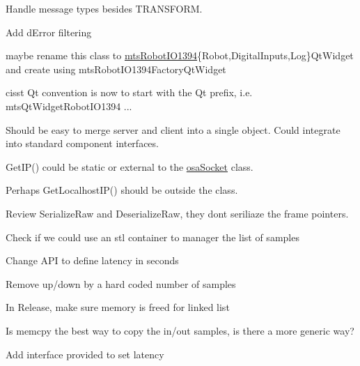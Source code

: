 \begin{DoxyRefList}
Handle message types besides T\+R\+A\+N\+S\+F\+O\+R\+M.  
\item[\label{todo__todo000014}%
\hypertarget{todo__todo000014}{}%
File \hyperlink{mts_p_i_d_8h}{mts\+P\+I\+D.h} ]Add d\+Error filtering  
\item[\label{todo__todo000019}%
\hypertarget{todo__todo000019}{}%
Class \hyperlink{classmts_robot_i_o1394_qt_widget}{mts\+Robot\+I\+O1394\+Qt\+Widget} ]maybe rename this class to \hyperlink{classmts_robot_i_o1394}{mts\+Robot\+I\+O1394}\{Robot,Digital\+Inputs,Log\}Qt\+Widget and create using mts\+Robot\+I\+O1394\+Factory\+Qt\+Widget 

cisst Qt convention is now to start with the Qt prefix, i.\+e. mts\+Qt\+Widget\+Robot\+I\+O1394 ...  
\item[\label{todo__todo000015}%
\hypertarget{todo__todo000015}{}%
Class \hyperlink{classmts_tele_operation}{mts\+Tele\+Operation} ]
\item[\label{todo__todo000009}%
\hypertarget{todo__todo000009}{}%
Class \hyperlink{classmts_watchdog_server}{mts\+Watchdog\+Server} ]Should be easy to merge server and client into a single object. Could integrate into standard component interfaces.  
\item[\label{todo__todo000006}%
\hypertarget{todo__todo000006}{}%
File \hyperlink{osa_socket_8h}{osa\+Socket.h} ]Get\+I\+P() could be static or external to the \hyperlink{classosa_socket}{osa\+Socket} class. 

Perhaps Get\+Localhost\+I\+P() should be outside the class.  
\item[\label{todo__todo000011}%
\hypertarget{todo__todo000011}{}%
Class \hyperlink{classprm_velocity_cartesian_set}{prm\+Velocity\+Cartesian\+Set} ]Review Serialize\+Raw and Deserialize\+Raw, they don\textquotesingle{}t seriliaze the frame pointers.  
\item[\label{todo__todo000010}%
\hypertarget{todo__todo000010}{}%
Class \hyperlink{classsvl_filter_add_latency}{svl\+Filter\+Add\+Latency} ]Check if we could use an stl container to manager the list of samples 

Change A\+P\+I to define latency in seconds 

Remove up/down by a hard coded number of samples 

In Release, make sure memory is freed for linked list 

Is memcpy the best way to copy the in/out samples, is there a more generic way? 

Add interface provided to set latency 


\end{DoxyRefList}
